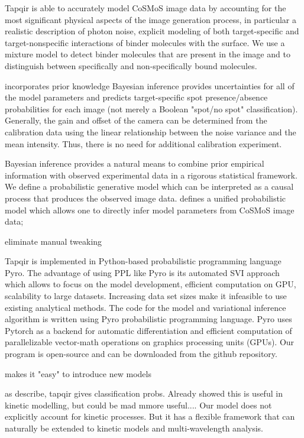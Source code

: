 Tapqir is able to accurately model CoSMoS image data by accounting for the most significant physical aspects of the image generation process, in particular a realistic description of photon noise, explicit modeling of both target-specific and target-nonspecific interactions of binder molecules with the surface. We use a mixture model to detect binder molecules that are present in the image and to distinguish between specifically and non-specifically bound molecules. 


incorporates prior knowledge
Bayesian inference provides uncertainties for all of the model parameters and predicts target-specific spot presence/absence probabilities for each image (not merely a Boolean "spot/no spot" classification). Generally, the gain and offset of the camera can be determined from the calibration data using the linear relationship between the noise variance and the mean intensity. Thus, there is no need for additional calibration experiment.

Bayesian inference provides a natural means to combine prior empirical information with observed experimental data in a rigorous statistical framework. We define a probabilistic generative model which can be interpreted as a causal process that produces the observed image data.  defines a unified probabilistic model which allows one to directly infer model parameters from CoSMoS image data;

eliminate manual tweaking


Tapqir is implemented in Python-based probabilistic programming language Pyro. The advantage of using PPL like Pyro is its automated SVI approach which allows to focus on the model development, efficient computation on GPU, scalability to large datasets. Increasing data set sizes make it infeasible to use existing analytical methods. The code for the model and variational inference algorithm is written using Pyro probabilistic programming language. Pyro uses Pytorch as a backend for automatic differentiation and efficient computation of parallelizable vector-math operations on graphics processing units (GPUs). Our program is open-source and can be downloaded from the github repository.

makes it "easy" to introduce new models

as describe, tapqir gives classification probs.  Already showed this is useful in kinetic modelling, but could be mad mmore useful....
Our model does not explicitly account for kinetic processes.  But it has a flexible framework that can naturally be extended to kinetic models and multi-wavelength analysis. 



